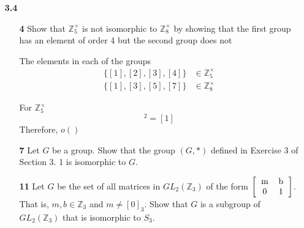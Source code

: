\documentclass[paper=usletter, fontsize=12pt]{article}
\begin{document}
    \vspace{-0.2in}

    \begin{itemize}

        \item[\textbf{3.4}]
        \begin{itemize}

            \item[\textbf{4}] Show that $\mathbb{Z}_{5}^{\times}$ is not
            isomorphic to $\mathbb{Z}_{8}^{\times}$ by showing that the first
            group has an element of order 4 but the second group does not
            \begin{cproof}

                The elements in each of the groups
                \begin{align*}
                    \{[1], [2], [3], [4]\} & \in \mathbb{Z}_{5}^{\times}\\
                    \{[1], [3], [5], [7]\} & \in \mathbb{Z}_{8}^{\times}
                \end{align*}

                For $\mathbb{Z}_{5}^{\times}$\\
                \begin{equation*}
                    [5]^2 = [1]
                \end{equation*}
                Therefore, $o()$

            \end{cproof}

            \item[\textbf{7}] Let $G$ be a group. Show that the group $(G, *)$
            defined in Exercise 3 of Section 3. 1 is isomorphic to $G$.
            \begin{cproof}
            \end{cproof}

            \item[\textbf{11}] Let $G$ be the set of all matrices in
            $GL_2(\mathbb{Z}_3)$ of the form $\left[\begin{tabular}{cc}
                    m & b \\
                    0 & 1
                \end{tabular}\right]$. That is, $m, b \in \mathbb{Z}_3$ and
            $m\neq [0]_3$. Show that $G$ is a subgroup of
            $GL_2(\mathbb{Z}_3)$ that is isomorphic to $S_3$.
            \begin{cproof}
            \end{cproof}


\end{itemize}
\end{itemize}
\end{document}
